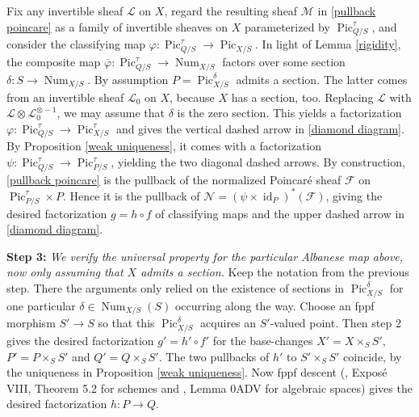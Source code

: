 \documentclass[oneside, 12pt]{amsart}
\theoremstyle{definition}
\theoremstyle{remark}
\newcommand{\shF}{\mathscr{F}}
\newcommand{\shM}{\mathscr{M}}
\newcommand{\shN}{\mathscr{N}}
\newcommand{\shL}{\mathscr{L}}
\newcommand{\id}{{\operatorname{id}}}
\newcommand{\Num}{\operatorname{Num}}
\newcommand{\Pic}{\operatorname{Pic}}
\newcommand{\ra}{\rightarrow}
\begin{document}
Fix any invertible sheaf $\shL$ on $X$, 
regard the resulting sheaf $\shM$ in \eqref{pullback poincare}   as a family of invertible sheaves on $X$ parameterized by $\Pic^\tau_{Q/S}$, and consider the   
classifying map $\varphi:\Pic^\tau_{Q/S}\ra\Pic_{X/S}$.
In light of   Lemma \ref{rigidity}, the composite map $\overline{\varphi}:\Pic^\tau_{Q/S}\ra\Num_{X/S}$ factors over some section $\delta:S\ra\Num_{X/S}$.
By assumption  $P=\Pic^\delta_{X/S}$ admits a section. The latter comes from an invertible sheaf $\shL_0$ on $X$,
because   $X$   has a section, too. Replacing $\shL$ with $\shL\otimes\shL_0^{\otimes-1}$, we may assume that $\delta$ is the zero section.
This yields  a factorization
$\varphi:\Pic^\tau_{Q/S}\ra \Pic^\tau_{X/S}$ and gives the vertical dashed arrow in \eqref{diamond diagram}. 
By Proposition \ref{weak uniqueness}, it comes with a factorization
 $\psi:\Pic^\tau_{Q/S}\ra\Pic^\tau_{P/S}$, yielding the two  diagonal dashed arrows.
By construction, \eqref{pullback poincare} is the pullback of the normalized Poincar\'e sheaf $\shF$ on $\Pic^\tau_{P/S}\times P$.
Hence it is the pullback of $\shN=(\psi\times\id_P)^*(\shF)$, giving the desired factorization $g=h\circ f$ of classifying maps
and the upper dashed arrow in \eqref{diamond diagram}.

\medskip
{\bf Step 3:}
\emph{We verify the universal property for the particular Albanese map above,
now only assuming that $X$  admits a section.} Keep the notation from the previous step.
There the arguments only relied on the existence of   sections in $\Pic^\delta_{X/S}$ for one particular
$\delta\in \Num_{X/S}(S)$ occurring along the way. Choose an fppf morphism $S'\ra S$ so that
this $\Pic^\delta_{X/S}$ acquires an $S'$-valued point.
Then step 2 gives the desired factorization $g'=h'\circ f'$ for the base-changes $X'=X\times_SS'$, $P'=P\times_SS'$
and $Q'=Q\times_SS'$. The two pullbacks of $h'$ to $S'\times_SS'$ coincide, by the uniqueness in Proposition \ref{weak uniqueness}.
Now fppf descent (\cite{SGA 1}, Expos\'e VIII, Theorem 5.2 for schemes and \cite{SP}, 
Lemma 0ADV for algebraic spaces) 
gives the desired factorization $h:P\ra Q$.
\end{document}
